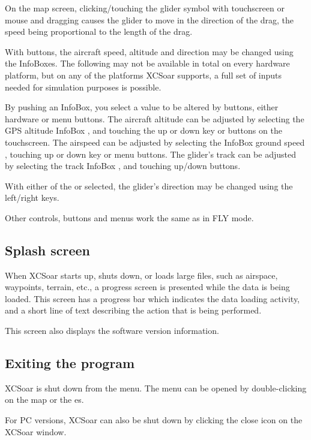 On the map screen, clicking/touching the glider symbol
with touchscreen or mouse and dragging 
causes the glider to move in the direction of the drag, the
speed being proportional to the length of the drag.

With buttons, the aircraft
speed, altitude and direction may be changed using the InfoBoxes.
The following may not be available in total on every hardware platform, but on 
any of the platforms XCSoar supports, a full set of inputs needed for 
simulation purposes is possible.

By pushing an InfoBox, you select a value to be altered by buttons, either
 hardware or menu buttons.
The aircraft altitude can be adjusted by selecting the GPS altitude
InfoBox , and touching the up or down key or buttons on the 
touchscreen.
The airspeed can be adjusted by selecting the InfoBox ground speed
, touching up or down key or menu buttons.
The glider's track  can be adjusted by selecting the track InfoBox
, and touching up/down buttons.

With either of the  or 
selected, the glider's direction may be changed using the left/right keys.

Other controls, buttons and menus work the same as in FLY mode.


\subsection*{Splash screen}
When XCSoar starts up, shuts down, or loads large files, such as airspace,
waypoints, terrain, etc., a progress screen is presented while the data is being
loaded. This screen has a progress bar which indicates the data loading
activity, and a short line of text describing the action that is being performed.

This screen also displays the software version information.

\subsection*{Exiting the program}
XCSoar is shut down from the menu. The menu can be
opened by double-clicking on the map or the \InfoBox es.
\begin{quote}
\end{quote}

For PC versions, XCSoar can also be shut down by clicking the close icon
on the XCSoar window.
